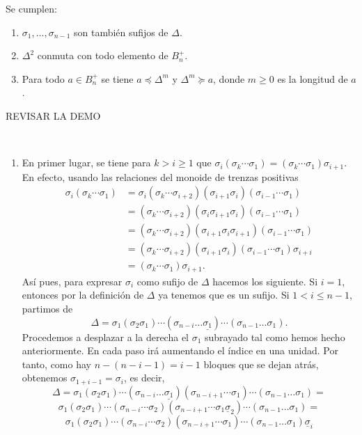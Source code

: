 \documentclass[bibtex, anon]{TEMat-article}
\begin{document}
\begin{proposicion}\label{sufijos} Se cumplen:
	\begin{enumerate}
		\item $\sigma_1,\dots,\sigma_{n-1}$ son también sufijos de $\Delta$.
		\item $\Delta^2$ conmuta con todo elemento de $B_n^+$.
		\item Para todo $a\in B_n^+$ se tiene $a\preccurlyeq\Delta^m$ y $\Delta^m\succcurlyeq a$, donde  $m\geq 0$ es la longitud de $a$.
	\end{enumerate}
	
\end{proposicion}
REVISAR LA DEMO
\begin{demostracion}\
	\begin{enumerate}
		\item En primer lugar, se tiene para $k>i\geq 1$ que $\sigma_i(\sigma_k\cdots\sigma_1)=(\sigma_k\cdots\sigma_1)\sigma_{i+1}$. En efecto, usando las relaciones del monoide de trenzas positivas
		\begin{align*}
		\sigma_i(\sigma_k\cdots\sigma_1)&=\sigma_i(\sigma_k\cdots\sigma_{i+2})(\sigma_{i+1}\sigma_i)(\sigma_{i-1}\cdots\sigma_1)\\
		&=(\sigma_k\cdots\sigma_{i+2})(\sigma_i\sigma_{i+1}\sigma_i)(\sigma_{i-1}\cdots\sigma_1)\\
		&=(\sigma_k\cdots\sigma_{i+2})(\sigma_{i+1}\sigma_i\sigma_{i+1})(\sigma_{i-1}\cdots\sigma_1)\\
		&=(\sigma_k\cdots\sigma_{i+2})(\sigma_{i+1}\sigma_i)(\sigma_{i-1}\cdots\sigma_1)\sigma_{i+i}\\
		&=(\sigma_k\cdots\sigma_1)\sigma_{i+1}.
		\end{align*}
		Así pues, para expresar $\sigma_i$ como sufijo de $\Delta$ hacemos los siguiente. Si $i=1$, entonces por la definición de $\Delta$ ya tenemos que es un sufijo. Si $1<i\leq n-1$, partimos de
		\[
		\Delta=\sigma_1(\sigma_2\sigma_1)\cdots(\sigma_{n-i}\dots\underline{\sigma_1})\cdots(\sigma_{n-1}\dots\sigma_1).
		\]
		Procedemos a desplazar a la derecha el $\sigma_1$ subrayado tal como hemos hecho anteriormente. En cada paso irá aumentando el índice en una unidad. Por tanto, como hay $n-(n-i-1)=i-1$ bloques que se dejan atrás, obtenemos $\sigma_{1+i-1}=\sigma_i$, es decir,
		\[
		\Delta=\sigma_1(\sigma_2\sigma_1)\cdots(\sigma_{n-i}\dots\underline{\sigma_1})(\sigma_{n-i+1}\cdots\sigma_1)\cdots(\sigma_{n-1}\dots\sigma_1)=
		\]
		\[
		\sigma_1(\sigma_2\sigma_1)\cdots(\sigma_{n-i}\cdots\sigma_2)(\sigma_{n-i+1}\cdots\sigma_1\underline{\sigma}_2)\cdots(\sigma_{n-1}\dots\sigma_1)=
		\]
		\[
		\sigma_1(\sigma_2\sigma_1)\cdots(\sigma_{n-i}\cdots\sigma_2)(\sigma_{n-i+1}\cdots\sigma_1)\cdots(\sigma_{n-1}\dots\sigma_1)\underline{\sigma}_i
		\]
		

\end{enumerate}
\end{demostracion}
\end{document}
